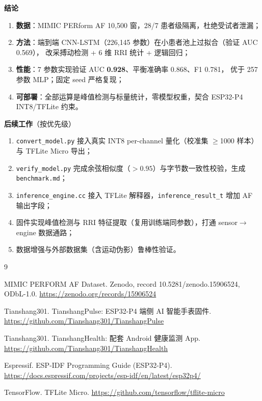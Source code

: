 \documentclass[11pt,a4paper]{ctexart}
\newcommand{\feat}[1]{\texttt{#1}}
\begin{document}
\textbf{结论}
\begin{enumerate}
  \item \textbf{数据}：MIMIC PERform AF 10{,}500 窗，28/7 患者级隔离，杜绝受试者泄漏；
  \item \textbf{方法}：端到端 CNN-LSTM（226{,}145 参数）在小患者池上过拟合（验证 AUC 0.569），
        改采搏动检测 + 6 维 RRI 统计 + 逻辑回归；
  \item \textbf{性能}：7 参数实现验证 AUC \textbf{0.928}、平衡准确率 0.868、F1 0.781，
        优于 257 参数 MLP；固定 seed 严格复现；
  \item \textbf{可部署}：全部运算是峰值检测与标量统计，零模型权重，契合 ESP32-P4 INT8/TFLite 约束。
\end{enumerate}

\textbf{后续工作}（按优先级）
\begin{enumerate}
  \item \feat{convert\_model.py} 接入真实 INT8 per-channel 量化（校准集 $\ge$1000 样本）与 TFLite Micro 导出；
  \item \feat{verify\_model.py} 完成余弦相似度（$>0.95$）与字节数一致性校验，生成 \feat{benchmark.md}；
  \item \feat{inference\_engine.cc} 接入 TFLite 解释器，\feat{inference\_result\_t} 增加 AF 输出字段；
  \item 固件实现峰值检测与 RRI 特征提取（复用训练端同参数），打通 sensor$\to$engine 数据通路；
  \item 数据增强与外部数据集（含运动伪影）鲁棒性验证。
\end{enumerate}

\begin{thebibliography}{9}
\setlength{\itemsep}{2pt}
  \item MIMIC PERFORM AF Dataset. Zenodo, record 10.5281/zenodo.15906524, ODbL-1.0.
        \url{https://zenodo.org/records/15906524}
  \item Tianshang301. TianshangPulse: ESP32-P4 端侧 AI 智能手表固件.
        \url{https://github.com/Tianshang301/TianshangPulse}
  \item Tianshang301. TianshangHealth: 配套 Android 健康监测 App.
        \url{https://github.com/Tianshang301/TianshangHealth}
  \item Espressif. ESP-IDF Programming Guide (ESP32-P4).
        \url{https://docs.espressif.com/projects/esp-idf/en/latest/esp32p4/}
  \item TensorFlow. TFLite Micro. \url{https://github.com/tensorflow/tflite-micro}
\end{thebibliography}
\end{document}
